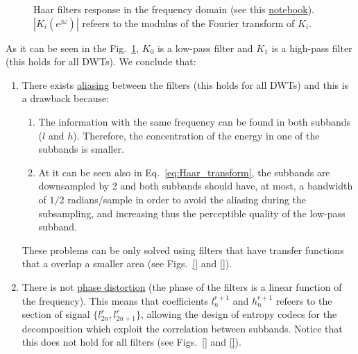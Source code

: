 \begin{figure}
  \centering
  \caption{Haar filters response in the frequency domain (see this
    \href{}{notebook}). $|K_i(e^{j\omega})|$ refeers to the
    modulus of the Fourier transform of $K_i$.}
  \label{fig:Haar_filters_response}
\end{figure}

As it can be seen in the Fig.~\ref{fig:Haar_filters_response}, $K_0$
is a low-pass filter and $K_1$ is a high-pass filter (this holds for
all DWTs). We conclude that:
\begin{enumerate}
\item There exists
  \href{https://en.wikipedia.org/wiki/Aliasing}{aliasing} between the
  filters (this holds for all DWTs) and this is a drawback because:
  \begin{enumerate}
  \item The information with the same
    frequency can be found in both subbands ($l$ and $h$). Therefore,
    the concentration of the energy in one of the subbands is
    smaller.
  \item At it can be seen also in Eq.~\ref{eq:Haar_transform}, the
    subbands are downsampled by 2 and both subbands should have, at
    most, a bandwidth of $1/2$ radians/sample in order to avoid the
    aliasing during the subsampling, and increasing thus the
    perceptible quality of the low-pass subband.
  \end{enumerate}
  These problems can be only solved using filters that have
  transfer functions that a overlap a smaller area
  (see Figs.~\ref{} and \ref{}). 
\item There is not
  \href{https://en.wikipedia.org/wiki/Linear_phase}{phase distortion}
  (the phase of the filters is a linear function of the
  frequency). This means that coefficients $l^{r+1}_n$ and $h^{r+1}_n$
  refeers to the section of signal $\{l^r_{2n}, l^r_{2n+1}\}$,
  allowing the design of entropy codecs for the decomposition which
  exploit the correlation between subbands. Notice that this does not
  hold for all filters (see Figs.~\ref{} and \ref{}).
\end{enumerate}


